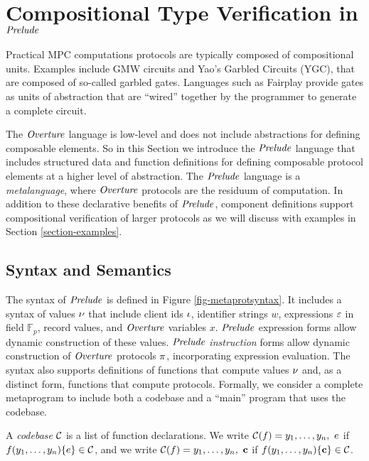 \section{Compositional Type Verification in $\mathit{Prelude}$}

Practical MPC computations protocols are
typically composed of compositional units. Examples include GMW circuits
and Yao's Garbled Circuits (YGC), that are composed of so-called
garbled gates. Languages such as Fairplay \cite{269581} provide gates as
units of abstraction that are ``wired'' together by the programmer to
generate a complete circuit.

The $\mathit{Overture}$ language is low-level and does not include abstractions
for defining composable elements. So in this Section we introduce the
$\mathit{Prelude}$ language that includes structured data and function
definitions for defining composable protocol elements at a higher
level of abstraction.  The $\mathit{Prelude}$ language is a
\emph{metalanguage}, where $\mathit{Overture}$ protocols are the residuum of
computation. In addition to these declarative benefits of $\mathit{Prelude}$,
component definitions support compositional verification of larger
protocols as we will discuss with examples in Section
\ref{section-examples}.

\metaprotsyntaxfig

\subsection{Syntax and Semantics}

The syntax of $\mathit{Prelude}$ is defined in Figure
\ref{fig-metaprotsyntax}.  It includes a syntax of values $\nu$ that
include client ids $\iota$, identifier strings $w$, expressions $\varepsilon$
in field $\mathbb{F}_p$, record values, and $\mathit{Overture}$ variables
$x$. $\mathit{Prelude}$ expression forms allow dynamic construction of these
values. $\mathit{Prelude}$ \emph{instruction} forms allow dynamic
construction of $\mathit{Overture}$ protocols $\pi$, incorporating expression
evaluation. The syntax also supports definitions of functions that
compute values $\nu$ and, as a distinct form, functions that compute
protocols.  Formally, we consider a complete metaprogram to include
both a codebase and a ``main'' program that uses the codebase.
\begin{definition}
A \emph{codebase} $\mathcal{C}$ is a list of function 
declarations. We write $ \mathcal{C}(f) = y_1,\ldots,y_n,\ e$
if $f(y_1,\ldots,y_n) \{ e \} \in \mathcal{C}$, and we
write  $ \codebase(f) = y_1,\ldots,y_n,\ \instr$
if $f(y_1,\ldots,y_n) \{ \mathbf{c} \} \in \mathcal{C}$.
\end{definition}

